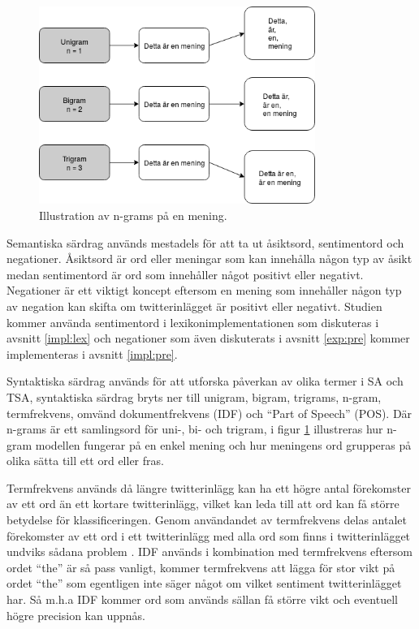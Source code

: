 \documentclass{kaumasters} %
\begin{document}
\begin{figure}[H]
\includegraphics[width=9cm]{grams}
\centering
\caption{Illustration av n-grams på en mening.}
\label{fig:grams}
\end{figure}

Semantiska särdrag används mestadels för att ta ut åsiktsord, sentimentord och negationer. Åsiktsord är ord eller meningar som kan innehålla någon typ av åsikt medan sentimentord är ord som innehåller något positivt eller negativt. Negationer är ett viktigt koncept eftersom en mening som innehåller någon typ av negation kan skifta om twitterinlägget är positivt eller negativt. Studien kommer använda sentimentord i lexikonimplementationen som diskuteras i avsnitt \ref{impl:lex} och negationer som även diskuterats i avsnitt \ref{exp:pre} kommer implementeras i avsnitt \ref{impl:pre}.

Syntaktiska särdrag används för att utforska påverkan av olika termer i SA och TSA, syntaktiska särdrag bryts ner till unigram, bigram, trigrams, n-gram, termfrekvens, omvänd dokumentfrekvens (IDF) och “Part of Speech” (POS). Där n-grams är ett samlingsord för uni-, bi- och trigram, i figur \ref{fig:grams} illustreras hur n-gram modellen fungerar på en enkel mening och hur meningens ord grupperas på olika sätta till ett ord eller fras. 

Termfrekvens används då längre twitterinlägg kan ha ett högre antal förekomster av ett ord än ett kortare twitterinlägg, vilket kan leda till att ord kan få större betydelse för klassificeringen. Genom användandet av termfrekvens delas antalet förekomster av ett ord i ett twitterinlägg med alla ord som finns i twitterinlägget undviks sådana problem \cite{scikit:001}. IDF \cite{idf:001} används i kombination med termfrekvens eftersom ordet “the” är så pass vanligt, kommer termfrekvens att lägga för stor vikt på ordet “the” som egentligen inte säger något om vilket sentiment twitterinlägget har. Så m.h.a IDF kommer ord som används sällan få större vikt och eventuell högre precision kan uppnås.
\end{document}
